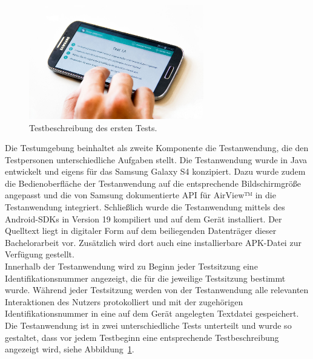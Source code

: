 \documentclass[12pt,numbers=noenddot,parskip,bibliography=totocnumbered,listof=totocnumbered]{scrreprt}
\begin{document}
\begin{figure}
\centering
\includegraphics[width=0.68\textwidth]{img/apparatus1.jpg}
\caption{Testbeschreibung des ersten Tests.}
\label{apparattestbeschreibung}
\end{figure}
Die Testumgebung beinhaltet als zweite Komponente die Testanwendung, die den Testpersonen unterschiedliche Aufgaben stellt. Die Testanwendung wurde in Java entwickelt und eigens für das Samsung Galaxy S4 konzipiert. Dazu wurde zudem die Bedienoberfläche der Testanwendung auf die entsprechende Bildschirmgröße angepasst und die von Samsung dokumentierte API für AirView™ in die Testanwendung integriert. Schließlich wurde die Testanwendung mittels des Android-SDKs in Version 19 kompiliert und auf dem Gerät installiert. Der Quelltext liegt in digitaler Form auf dem beiliegenden Datenträger dieser Bachelorarbeit vor. Zusätzlich wird dort auch eine installierbare APK-Datei zur Verfügung gestellt.\\
Innerhalb der Testanwendung wird zu Beginn jeder Testsitzung eine Identifikationsnummer angezeigt, die für die jeweilige Testsitzung bestimmt wurde. Während jeder Testsitzung werden von der Testanwendung alle relevanten Interaktionen des Nutzers protokolliert und mit der zugehörigen Identifikationsnummer in eine auf dem Gerät angelegten Textdatei gespeichert.\\
Die Testanwendung ist in zwei unterschiedliche Tests unterteilt und wurde so gestaltet, dass vor jedem Testbeginn eine entsprechende Testbeschreibung angezeigt wird, siehe Abbildung~\ref{apparattestbeschreibung}.
\end{document}
